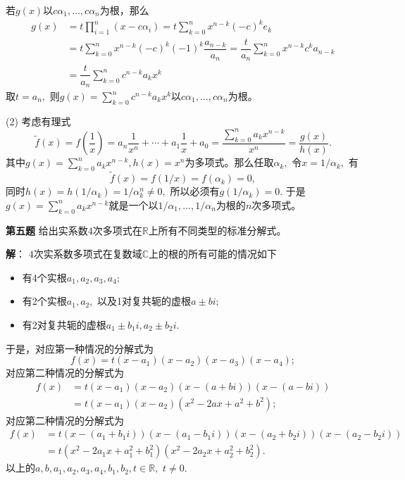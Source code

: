 若$g(x)$以$c\alpha_1, \ldots, c\alpha_n$为根，那么
\begin{align*}
g(x) & = t \prod\limits_{i=1}^n (x - c\alpha_i) = t \sum\limits_{k=0}^n x^{n-k} (-c)^k e_k \\
& = t \sum\limits_{k=0}^n x^{n-k} (-c)^k (-1)^k \dfrac{a_{n-k}}{a_n} = \dfrac{t}{a_n} \sum\limits_{k=0}^n x^{n-k} c^k a_{n-k} \\
& = \dfrac{t}{a_n} \sum\limits_{k=0}^n c^{n-k} a_k x^k
\end{align*}
取$t = a_n,$ 则$g(x) = \sum\limits_{k=0}^n c^{n-k} a_k x^k$以$c\alpha_1, \ldots, c\alpha_n$为根。

(2) 考虑有理式
$$\tilde{f}(x) = f \left( \dfrac{1}{x} \right) = a_n \dfrac{1}{x^n} + \cdots + a_1 \dfrac{1}{x} + a_0 = \dfrac{\sum\limits_{k=0}^n a_k x^{n-k}}{x^n} = \dfrac{g(x)}{h(x)}.$$
其中$g(x) = \sum\limits_{k=0}^n a_k x^{n-k}, h(x) = x^n$为多项式。那么任取$\alpha_k,$ 令$x = 1/\alpha_k,$ 有
$$\tilde{f}(x) = f(1/x) = f(\alpha_k) = 0,$$
同时$h(x) = h(1/\alpha_k) = 1/\alpha_k^n \neq 0,$ 所以必须有$g(1/\alpha_k) = 0.$ 于是$g(x) = \sum\limits_{k=0}^n a_k x^{n-k}$就是一个以$1/\alpha_1, \ldots, 1/\alpha_n$为根的$n$次多项式。

\fi  %

\newpageorvspace

{\bf 第五题} 给出实系数$4$次多项式在$\mathbb{R}$上所有不同类型的标准分解式。

\ifIncludeAnswer

\newpageorvspace

{\bf 解}： $4$次实系数多项式在复数域$\mathbb{C}$上的根的所有可能的情况如下
\begin{itemize}
\item 有4个实根$a_1, a_2, a_3, a_4;$
\item 有2个实根$a_1, a_2,$ 以及1对复共轭的虚根$a \pm bi;$
\item 有2对复共轭的虚根$a_1 \pm b_1i, a_2 \pm b_2i.$
\end{itemize}
于是，对应第一种情况的分解式为
$$f(x) = t(x-a_1)(x-a_2)(x-a_3)(x-a_4);$$
对应第二种情况的分解式为
\begin{align*}
f(x) & = t(x-a_1)(x-a_2)(x-(a + bi))(x-(a - bi)) \\
& = t(x-a_1)(x-a_2)(x^2-2ax+a^2+b^2);
\end{align*}
对应第二种情况的分解式为
\begin{align*}
f(x) & = t(x-(a_1 + b_1i))(x-(a_1 - b_1i))(x-(a_2 + b_2i))(x-(a_2 - b_2i)) \\
& = t(x^2-2a_1x+a_1^2+b_1^2)(x^2-2a_2x+a_2^2+b_2^2).
\end{align*}
以上的$a, b, a_1, a_2, a_3, a_4, b_1, b_2, t \in \mathbb{R},$ $t \neq 0.$

